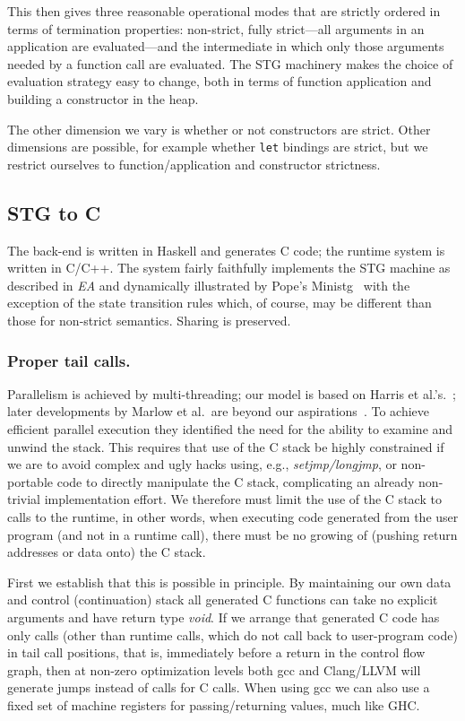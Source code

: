 \documentclass{llncs}
\begin{document}
This then gives three reasonable operational modes that are strictly ordered
in terms of termination properties: non-strict, fully strict---all arguments
in an application are evaluated---and the intermediate in which only those
arguments needed by a function call are evaluated.  The STG machinery makes
the choice of evaluation strategy easy to change, both in terms of function
application and building a constructor in the heap.

The other dimension we vary is whether or not constructors are strict.  Other
dimensions are possible, for example whether \texttt{let} bindings are strict,
but we restrict ourselves to function/application and constructor strictness.

\subsection{STG to C}
The back-end is written in Haskell and generates C code;
the runtime system is written in C/C++.  The system fairly faithfully
implements the STG machine as described in \emph{EA} and dynamically
illustrated by Pope's Ministg~\cite{ministg} with the exception of the state
transition rules which, of course, may be different than those for non-strict
semantics.  Sharing is preserved.

\subsubsection{Proper tail calls.}
Parallelism is achieved by multi-threading; our model is based on Harris et
al.'s.~\cite{Harris:2005}; later developments by Marlow et al.\ are beyond our
aspirations~\cite{Marlow:2009}.  To achieve efficient parallel execution they
identified the need for the ability to examine and unwind the stack.  This
requires that use of the C stack be highly constrained if we are to 
avoid complex and ugly hacks using, e.g., \emph{setjmp/longjmp}, or
non-portable code to directly manipulate the C stack, complicating an
already non-trivial implementation effort.  We therefore must limit the
use of the C stack to calls to the runtime, in other words, when executing
code generated from the user program (and not in a runtime call), there
must be no growing of (pushing return addresses or data onto) the C stack.

First we establish that this is possible in principle.  By maintaining our own
data and control (continuation) stack all generated C functions can take no
explicit arguments and have return type \emph{void}. If we arrange that
generated C code has only calls (other than runtime calls, which do not call
back to user-program code) in tail call positions, that is, immediately before
a return in the control flow graph, then at non-zero optimization levels both
gcc and Clang/LLVM will generate jumps instead of calls for C calls.  When
using gcc we can also use a fixed set of machine registers for
passing/returning values, much like GHC.
\end{document}
